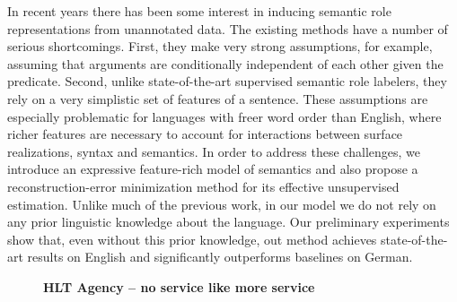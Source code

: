 \documentclass[10pt, a4paper, twopage, headinclude, footinclude, BCOR5mm]{scrartcl}
\begin{document}
{{\begin{table}[t!]
{\begin{tabular}{cc}
        
    \end{tabular} }
    \end{table}

\noindent
In recent years there has been some interest in inducing semantic role representations  from unannotated data. The existing methods have a number of serious shortcomings. First, they make very strong assumptions, for example, assuming that arguments are conditionally independent of each other given the predicate. Second, unlike state-of-the-art supervised semantic role labelers, they rely on a very simplistic set of features of a sentence. These assumptions are especially problematic for languages with freer word order than English, where richer features are necessary to account for interactions between surface realizations, syntax and semantics.  In order to address these challenges, we introduce an expressive feature-rich model of semantics and also propose a reconstruction-error minimization method for its effective unsupervised estimation.  Unlike much of the previous work, in our model we do not rely on any prior linguistic knowledge about the language.  Our preliminary experiments show that, even without this prior knowledge, out method achieves state-of-the-art results on English and significantly outperforms baselines on German. 


\newpage

\begin{figure}[t!]
\centering
\large\textbf{HLT Agency – no service like more service}
\vspace*{0.5cm}
\end{figure}


        \begin{table}[t!]
    \end{table}

}}
\end{document}

